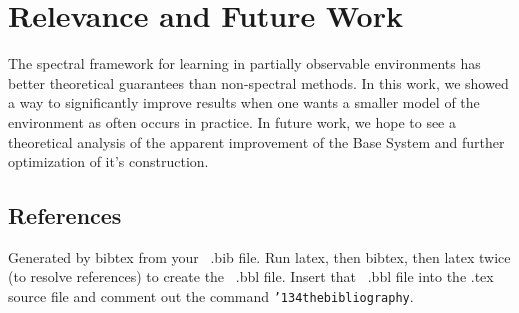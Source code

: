 \documentclass{acm_proc_article-sp}
\begin{document}

\section{Relevance and Future Work}
The spectral framework for learning in partially observable environments has better theoretical guarantees \cite{Lamport:LaTeX} than non-spectral methods. In this work, we showed a way to significantly improve results when one wants a smaller model of the environment as often occurs in practice. In future work, we hope to see a theoretical analysis of the apparent improvement of the Base System and further optimization of it's construction.

%

%
\subsection{References}
Generated by bibtex from your ~.bib file.  Run latex,
then bibtex, then latex twice (to resolve references)
to create the ~.bbl file.  Insert that ~.bbl file into
the .tex source file and comment out
the command \texttt{{\char'134}thebibliography}.
\end{document}
